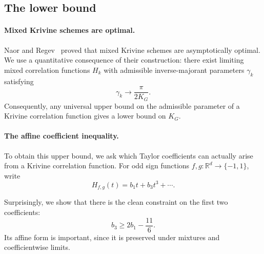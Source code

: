 

\subsection{The lower bound}

\paragraph{Mixed Krivine schemes are optimal.}
Naor and Regev~\cite{naor2014krivine} proved that mixed Krivine schemes are asymptotically optimal. We use a quantitative consequence of their construction: there exist limiting mixed correlation functions \(H_k\) with admissible inverse-majorant parameters \(\gamma_k\) satisfying
\[
    \gamma_k\longrightarrow\frac{\pi}{2K_G}.
\]
Consequently, any universal upper bound on the admissible parameter of a Krivine correlation function gives a lower bound on \(K_G\).


\paragraph{The affine coefficient inequality.}
To obtain this upper bound, we ask which Taylor coefficients can actually arise from a Krivine correlation function. For odd sign functions \(f,g:\mathbb R^d\to\{-1,1\}\), write
\[
    H_{f,g}(t)=b_1t+b_3t^3+\cdots.
\]

Surprisingly, we show that there is the clean constraint on the first two coefficients:
\begin{equation}
    b_3\geq 2b_1-\frac{11}{6}.
    \label{eq:affine-coefficient-inequality}
\end{equation}
Its affine form is important, since it is preserved under mixtures and coefficientwise limits. 

